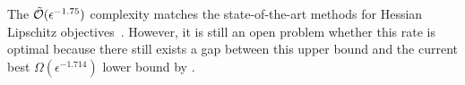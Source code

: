 \documentclass[twoside,11pt]{article}
\begin{document}
The $\tilde {{\mathcal{O}}}(\epsilon^{-1.75})$ complexity matches the state-of-the-art methods for Hessian Lipschitz objectives~\citep{jin2018accelerated,carmon2017convex,li2023restarted}. However, it is still an open problem whether this rate is optimal because there still exists a gap between this upper bound and the current best $\Omega(\epsilon^{-1.714})$ lower bound by \citet{carmon2021lower}.









\end{document}
